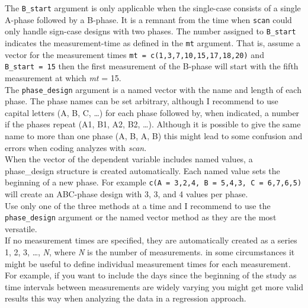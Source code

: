 \documentclass[
  letterpaper,
  DIV=11,
  numbers=noendperiod]{scrreprt}
\begin{document}
The \texttt{B\_start} argument is only applicable when the single-case
consists of a single A-phase followed by a B-phase. It is a remnant from
the time when \texttt{scan} could only handle sign-case designs with two
phases. The number assigned to \texttt{B\_start} indicates the
measurement-time as defined in the \texttt{mt} argument. That is, assume
a vector for the measurement times
\texttt{mt\ =\ c(1,3,7,10,15,17,18,20)} and \texttt{B\_start\ =\ 15}
then the first measurement of the B-phase will start with the fifth
measurement at which \emph{mt} = 15.\\
The \texttt{phase\_design} argument is a named vector with the name and
length of each phase. The phase names can be set arbitrary, although I
recommend to use capital letters (A, B, C, \ldots) for each phase
followed by, when indicated, a number if the phases repeat (A1, B1, A2,
B2, \ldots). Although it is possible to give the same name to more than
one phase (A, B, A, B) this might lead to some confusion and errors when
coding analyzes with \emph{scan}.\\
When the vector of the dependent variable includes named values, a
phase\_design structure is created automatically. Each named value sets
the beginning of a new phase. For example
\texttt{c(A\ =\ 3,2,4,\ B\ =\ 5,4,3,\ C\ =\ 6,7,6,5)} will create an
ABC-phase design with 3, 3, and 4 values per phase.\\
Use only one of the three methods at a time and I recommend to use the
\texttt{phase\_design} argument or the named vector method as they are
the most versatile.\\
If no measurement times are specified, they are automatically created as
a series 1, 2, 3, \ldots, \emph{N}, where \emph{N} is the number of
measurements. in some circumstances it might be useful to define
individual measurement times for each measurement. For example, if you
want to include the days since the beginning of the study as time
intervals between measurements are widely varying you might get more
valid results this way when analyzing the data in a regression approach.
\end{document}
